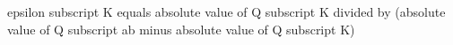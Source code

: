 epsilon subscript K equals absolute value of Q subscript K divided by (absolute value of Q subscript ab minus absolute value of Q subscript K)